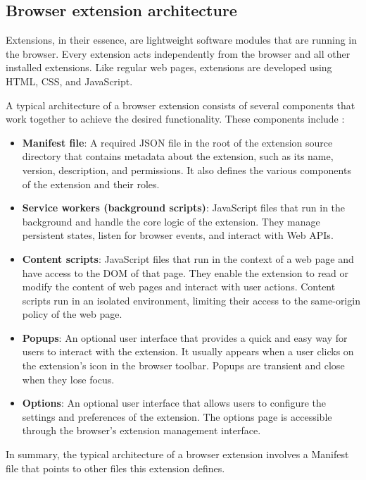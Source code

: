 \subsection{Browser extension architecture}

Extensions, in their essence, are lightweight software modules that are running in the browser. Every extension acts independently from the browser and all other installed extensions. Like regular web pages, extensions are developed using HTML, CSS, and JavaScript.

A typical architecture of a browser extension consists of several components that work together to achieve the desired functionality. These components include \cite{ChromeWebExtensions}:

\begin{itemize}
	\item \textbf{Manifest file}: A required JSON file in the root of the extension source directory that contains metadata about the extension, such as its name, version, description, and permissions. It also defines the various components of the extension and their roles.
	\item \textbf{Service workers (background scripts)}: JavaScript files that run in the background and handle the core logic of the extension. They manage persistent states, listen for browser events, and interact with Web APIs.
	\item \textbf{Content scripts}: JavaScript files that run in the context of a web page and have access to the DOM of that page. They enable the extension to read or modify the content of web pages and interact with user actions. Content scripts run in an isolated environment, limiting their access to the same-origin policy of the web page.
	\item \textbf{Popups}: An optional user interface that provides a quick and easy way for users to interact with the extension. It usually appears when a user clicks on the extension's icon in the browser toolbar. Popups are transient and close when they lose focus.
	\item \textbf{Options}: An optional user interface that allows users to configure the settings and preferences of the extension. The options page is accessible through the browser's extension management interface.
\end{itemize}

In summary, the typical architecture of a browser extension involves a Manifest file that points to other files this extension defines.

